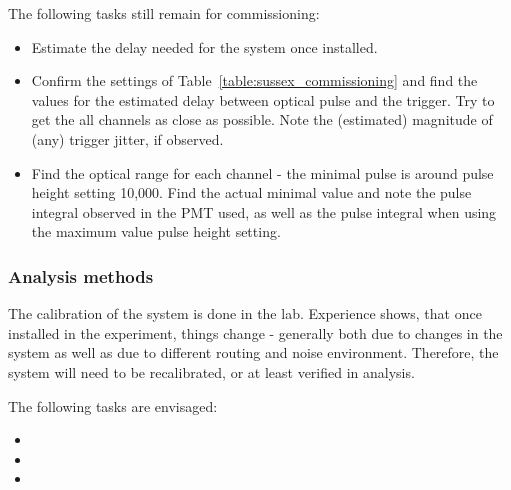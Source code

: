 The following tasks still remain for commissioning:
\begin{itemize}
\item Estimate the delay needed for the system once installed.
\item Confirm the settings of Table~\ref{table:sussex_commissioning} and find the values for the estimated delay between optical pulse and the trigger. Try to get the all channels as close as possible. Note the (estimated) magnitude of (any) trigger jitter, if observed.
\item Find the optical range for each channel - the minimal pulse is around pulse height setting 10,000. Find the actual minimal value and note the pulse integral observed in the PMT used, as well as the pulse integral when using the maximum value pulse height setting.
\end{itemize}

\subsubsection*{Analysis methods}

The calibration of the system is done in the lab. Experience shows, that once installed in the experiment, things change - generally both due to changes in the system as well as due to different routing and noise environment. Therefore, the system will need to be recalibrated, or at least verified in analysis.

The following tasks are envisaged:
\begin{itemize}
\item 
\item
\item 
\end{itemize}